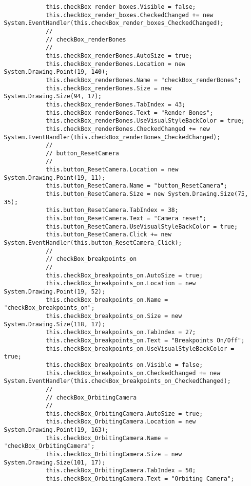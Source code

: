 \begin{scriptsize}
\begin{verbatim}
            this.checkBox_render_boxes.Visible = false;
            this.checkBox_render_boxes.CheckedChanged += new System.EventHandler(this.checkBox_render_boxes_CheckedChanged);
            // 
            // checkBox_renderBones
            // 
            this.checkBox_renderBones.AutoSize = true;
            this.checkBox_renderBones.Location = new System.Drawing.Point(19, 140);
            this.checkBox_renderBones.Name = "checkBox_renderBones";
            this.checkBox_renderBones.Size = new System.Drawing.Size(94, 17);
            this.checkBox_renderBones.TabIndex = 43;
            this.checkBox_renderBones.Text = "Render Bones";
            this.checkBox_renderBones.UseVisualStyleBackColor = true;
            this.checkBox_renderBones.CheckedChanged += new System.EventHandler(this.checkBox_renderBones_CheckedChanged);
            // 
            // button_ResetCamera
            // 
            this.button_ResetCamera.Location = new System.Drawing.Point(19, 11);
            this.button_ResetCamera.Name = "button_ResetCamera";
            this.button_ResetCamera.Size = new System.Drawing.Size(75, 35);
            this.button_ResetCamera.TabIndex = 38;
            this.button_ResetCamera.Text = "Camera reset";
            this.button_ResetCamera.UseVisualStyleBackColor = true;
            this.button_ResetCamera.Click += new System.EventHandler(this.button_ResetCamera_Click);
            // 
            // checkBox_breakpoints_on
            // 
            this.checkBox_breakpoints_on.AutoSize = true;
            this.checkBox_breakpoints_on.Location = new System.Drawing.Point(19, 52);
            this.checkBox_breakpoints_on.Name = "checkBox_breakpoints_on";
            this.checkBox_breakpoints_on.Size = new System.Drawing.Size(118, 17);
            this.checkBox_breakpoints_on.TabIndex = 27;
            this.checkBox_breakpoints_on.Text = "Breakpoints On/Off";
            this.checkBox_breakpoints_on.UseVisualStyleBackColor = true;
            this.checkBox_breakpoints_on.Visible = false;
            this.checkBox_breakpoints_on.CheckedChanged += new System.EventHandler(this.checkBox_breakpoints_on_CheckedChanged);
            // 
            // checkBox_OrbitingCamera
            // 
            this.checkBox_OrbitingCamera.AutoSize = true;
            this.checkBox_OrbitingCamera.Location = new System.Drawing.Point(19, 163);
            this.checkBox_OrbitingCamera.Name = "checkBox_OrbitingCamera";
            this.checkBox_OrbitingCamera.Size = new System.Drawing.Size(101, 17);
            this.checkBox_OrbitingCamera.TabIndex = 50;
            this.checkBox_OrbitingCamera.Text = "Orbiting Camera";

\end{verbatim}
\end{scriptsize}
